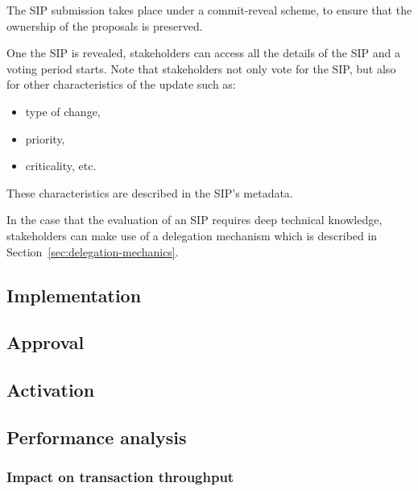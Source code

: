 \documentclass[11pt,a4paper]{article}
\begin{document}
The SIP submission takes place under a commit-reveal scheme, to ensure that the
ownership of the proposals is preserved.
%
%

One the SIP is revealed, stakeholders can access all the details of the SIP and
a voting period starts. Note that stakeholders not only vote for the SIP, but
also for other characteristics of the update such as:
\begin{itemize}
\item type of change,
\item priority,
\item criticality, etc.
\end{itemize}
These characteristics are described in the SIP's metadata.

In the case that the evaluation of an SIP requires deep technical knowledge,
stakeholders can make use of a delegation mechanism which is described in
Section~\ref{sec:delegation-mechanics}.

\subsection{Implementation}
\label{sec:implementation}

\subsection{Approval}
\label{sec:approval}

\subsection{Activation}
\label{sec:activation}


\subsection{Performance analysis}
\label{sec:performance-analysis}

\subsubsection{Impact on transaction throughput}
\label{sec:impact-trans-thro}
\end{document}
